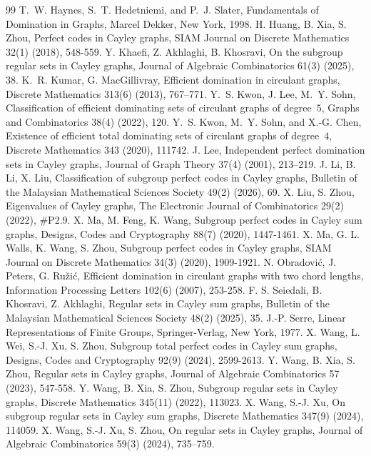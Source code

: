 \documentclass[12pt]{article}
\begin{document}
\begin{thebibliography}{99}
 T.~W. Haynes, S.~T. Hedetniemi, and P.~J. Slater, Fundamentals of Domination in Graphs, Marcel Dekker, New York, 1998.
 H. Huang, B. Xia, S. Zhou, Perfect codes in Cayley graphs, SIAM Journal on Discrete Mathematics 32(1) (2018), 548-559.
 Y. Khaefi, Z. Akhlaghi, B. Khosravi, On the subgroup regular sets in Cayley graphs, Journal of Algebraic Combinatorics 61(3) (2025), 38.
 K.~R. Kumar, G. MacGillivray, Efficient domination in circulant graphs, Discrete Mathematics 313(6) (2013), 767--771.
 Y.~S. Kwon, J. Lee, M.~Y. Sohn, Classification of efficient dominating sets of circulant graphs of degree~$5$, Graphs and Combinatorics 38(4) (2022), 120.
 Y.~S. Kwon, M.~Y. Sohn, and X.-G. Chen, Existence of efficient total dominating sets of circulant graphs of degree~$4$, Discrete Mathematics 343 (2020), 111742.
 J. Lee, Independent perfect domination sets in Cayley graphs, Journal of Graph Theory 37(4) (2001), 213--219.
 J. Li, B. Li, X. Liu, Classification of subgroup perfect codes in Cayley graphs, Bulletin of the Malaysian Mathematical Sciences Society 49(2) (2026), 69.
 X. Liu, S. Zhou, Eigenvalues of Cayley graphs, The Electronic Journal of Combinatorics 29(2) (2022), \#P2.9.
 X. Ma, M. Feng, K. Wang, Subgroup perfect codes in Cayley sum graphs, Designs, Codes and Cryptography 88(7) (2020), 1447-1461.	
 X. Ma, G. L. Walls, K. Wang, S. Zhou, Subgroup perfect codes in Cayley graphs, SIAM Journal on Discrete Mathematics 34(3) (2020), 1909-1921.
 N. Obradović, J. Peters, G. Ružić, Efficient domination in circulant graphs with two chord lengths, Information Processing Letters 102(6) (2007), 253-258.
 F. S. Seiedali, B. Khosravi, Z. Akhlaghi, Regular sets in Cayley sum graphs, Bulletin of the Malaysian Mathematical Sciences Society 48(2) (2025), 35.
 J.-P. Serre, Linear Representations of Finite Groups, Springer-Verlag, New York, 1977.
 X. Wang, L. Wei, S.-J. Xu, S. Zhou, Subgroup total perfect codes in Cayley sum graphs, Designs, Codes and Cryptography 92(9) (2024), 2599-2613.
 Y. Wang, B. Xia, S. Zhou, Regular sets in Cayley graphs, Journal of Algebraic Combinatorics 57 (2023), 547-558.
 Y. Wang, B. Xia, S. Zhou, Subgroup regular sets in Cayley graphs, Discrete Mathematics 345(11) (2022), 113023.
 X. Wang, S.-J. Xu, On subgroup regular sets in Cayley sum graphs, Discrete Mathematics 347(9) (2024), 114059.
 X. Wang, S.-J. Xu, S. Zhou, On regular sets in Cayley graphs, Journal of Algebraic Combinatorics 59(3) (2024), 735--759.

\end{thebibliography}
\end{document}
